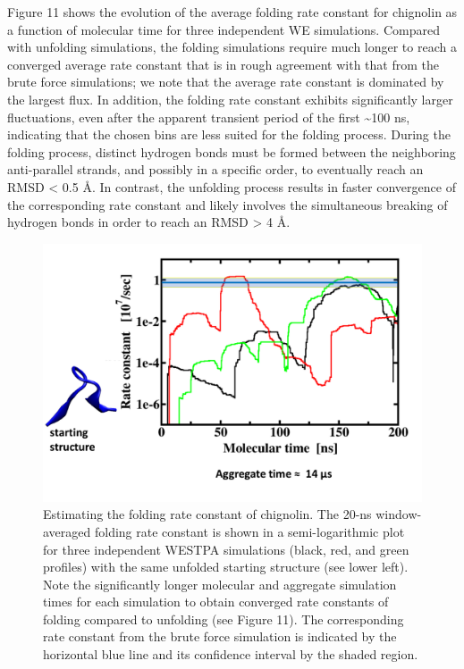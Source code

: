 \documentclass[9pt,tutorial,pubversion]{livecoms}
\begin{document}
Figure 11 shows the evolution of the average folding rate constant for chignolin as a function of molecular time for three independent WE simulations. 
Compared with unfolding simulations, the folding simulations require much longer to reach a converged average rate constant that is in rough agreement with that from the brute force simulations; we note that the average rate constant is dominated by the largest flux. 
In addition, the folding rate constant exhibits significantly larger fluctuations, even after the apparent transient period of the first \textasciitilde 100 ns, indicating that the chosen bins are less suited for the folding process. 
During the folding process, distinct hydrogen bonds must be formed between the neighboring anti-parallel strands, and possibly in a specific order, to eventually reach an RMSD < 0.5 \AA. 
In contrast, the unfolding process results in faster convergence of the corresponding rate constant and likely involves the simultaneous breaking of hydrogen bonds in order to reach an RMSD > 4 \AA.

\begin{figure}
\includegraphics[width=\linewidth]{Figure11.png}
\caption{Estimating the folding rate constant of chignolin. 
The 20-ns window-averaged folding rate constant is shown in a semi-logarithmic plot for three independent WESTPA simulations (black, red, and green profiles) with the same unfolded starting structure (see lower left). 
Note the significantly longer molecular and aggregate simulation times for each simulation to obtain converged rate constants of folding compared to unfolding (see Figure 11). 
The corresponding rate constant from the brute force simulation is indicated by the horizontal blue line and its confidence interval by the shaded region.}
\label{fig:view}
\end{figure}
\end{document}
